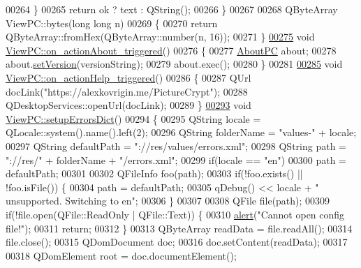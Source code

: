 \begin{DoxyCode}
00264     \}
00265     \textcolor{keywordflow}{return} ok ? text : QString();
00266 \}
00267 
00268 QByteArray ViewPC::bytes(\textcolor{keywordtype}{long} \textcolor{keywordtype}{long} n)
00269 \{
00270     \textcolor{keywordflow}{return} QByteArray::fromHex(QByteArray::number(n, 16));
00271 \}
\hypertarget{viewpc_8cpp_source.tex_l00275}{}\hyperlink{class_view_p_c_a09a46da4d492eb3dde88f35dc58c997b}{00275} \textcolor{keywordtype}{void} \hyperlink{class_view_p_c_a09a46da4d492eb3dde88f35dc58c997b}{ViewPC::on\_actionAbout\_triggered}()
00276 \{
00277     \hyperlink{class_about_p_c}{AboutPC} about;
00278     about.\hyperlink{class_about_p_c_aa3815d4826d0c8d87122449537a0a4d5}{setVersion}(versionString);
00279     about.exec();
00280 \}
00281 
\hypertarget{viewpc_8cpp_source.tex_l00285}{}\hyperlink{class_view_p_c_a0d252ff4829260c6c76769fbd24b7cd7}{00285} \textcolor{keywordtype}{void} \hyperlink{class_view_p_c_a0d252ff4829260c6c76769fbd24b7cd7}{ViewPC::on\_actionHelp\_triggered}()
00286 \{
00287     QUrl docLink(\textcolor{stringliteral}{"https://alexkovrigin.me/PictureCrypt"});
00288     QDesktopServices::openUrl(docLink);
00289 \}
\hypertarget{viewpc_8cpp_source.tex_l00293}{}\hyperlink{class_view_p_c_a89236a0bb8760f02e984b85a8571934c}{00293} \textcolor{keywordtype}{void} \hyperlink{class_view_p_c_a89236a0bb8760f02e984b85a8571934c}{ViewPC::setupErrorsDict}()
00294 \{
00295     QString locale = QLocale::system().name().left(2);
00296     QString folderName = \textcolor{stringliteral}{"values-"} + locale;
00297     QString defaultPath = \textcolor{stringliteral}{"://res/values/errors.xml"};
00298     QString path = \textcolor{stringliteral}{"://res/"} + folderName + \textcolor{stringliteral}{"/errors.xml"};
00299     \textcolor{keywordflow}{if}(locale == \textcolor{stringliteral}{"en"})
00300         path = defaultPath;
00301 
00302     QFileInfo foo(path);
00303     \textcolor{keywordflow}{if}(!foo.exists() || !foo.isFile()) \{
00304         path = defaultPath;
00305         qDebug() << locale + \textcolor{stringliteral}{" unsupported. Switching to en"};
00306     \}
00307 
00308     QFile file(path);
00309     \textcolor{keywordflow}{if}(!file.open(QFile::ReadOnly | QFile::Text)) \{
00310         \hyperlink{class_view_p_c_a7c467169467789561078abc9d4fe57bd}{alert}(\textcolor{stringliteral}{"Cannot open config file!"});
00311         \textcolor{keywordflow}{return};
00312     \}
00313     QByteArray readData = file.readAll();
00314     file.close();
00315     QDomDocument doc;
00316     doc.setContent(readData);
00317 
00318     QDomElement root = doc.documentElement();

\end{DoxyCode}

